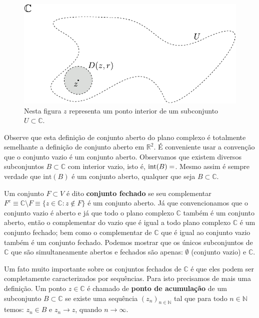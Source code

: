 \begin{figure}[h]
\centering
\includegraphics[scale=0.8]{Figuras/ponto-interior}
\caption{Nesta figura $z$ representa um ponto interior de um subconjunto $U\subset \mathbb{C}$.}
\label{fig:ponto-interior}
\end{figure}


Observe que esta definição de conjunto aberto do plano complexo é totalmente semelhante a definição de 
conjunto aberto em $\mathbb{R}^2$. É conveniente usar a convenção que o conjunto vazio é um conjunto aberto.
Observamos que existem diversos subconjuntos $B\subset \mathbb{C}$ com interior vazio, isto é, 
$\mathrm{int}(B)=\empty$. Mesmo assim é sempre verdade que $\mathrm{int}(B)$ é um conjunto
aberto, qualquer que seja $B\subset \mathbb{C}$. 

\medskip 

Um conjunto $F\subset V$ é dito {\bf conjunto fechado} se seu 
complementar $F^c\equiv \mathbb{C}\setminus F \equiv \{z\in \mathbb{C}: z\notin F\}$
é um conjunto aberto. 
Já que convencionamos que o conjunto vazio é aberto e já que todo o plano complexo $\mathbb{C}$
também é um conjunto aberto, então o complementar do vazio que é igual a todo plano complexo $\mathbb{C}$ é
um conjunto fechado; bem como o complementar de $\mathbb{C}$ que é igual ao conjunto vazio também é um conjunto
fechado. Podemos mostrar que os únicos subconjuntos de $\mathbb{C}$ que são simultaneamente abertos e fechados
são apenas: $\emptyset$ (conjunto vazio) e $\mathbb{C}$.

Um fato muito importante sobre os conjuntos fechados de $\mathbb{C}$ é que eles 
podem ser completamente caracterizados por sequências. Para isto precisamos de mais uma definição.
Um ponto $z\in\mathbb{C}$ é chamado de {\bf ponto de acumulação} de
um subconjunto $B\subset\mathbb{C}$ se existe uma sequência $(z_n)_{n\in\mathbb{N}}$
tal que para todo $n\in\mathbb{N}$ temos: $z_n\in B$ e $z_n\to z$,
quando $n\to\infty$. 


